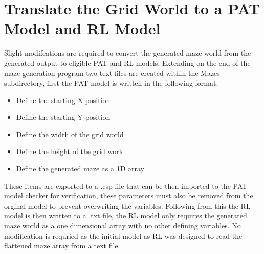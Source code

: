 \documentclass[twoside, 12pt, a4paper]{article}
\begin{document}
\section{Translate the Grid World to a PAT Model and RL Model}
Slight modifcations are required to convert the generated maze world from the generated output to eligible PAT and RL models. Extending on the end of the maze generation program two text files are created within the Mazes subdirectory, first the PAT model is written in the following format:
\begin{itemize}
 \item Define the starting X position
 \item Define the starting Y position
 \item Define the width of the grid world
 \item Define the height of the grid world
 \item Define the generated maze as a 1D array
\end{itemize}
These items are exported to a .csp file that can be then imported to the PAT model checker for verification, these parameters must also be removed from the orginal model to prevent overwriting the variables. Following from this the RL model is then written to a .txt file, the RL model only requires the generated maze world as a one dimensional array with no other defining variables. No modification is requried as the initial model as RL was designed to read the flattened maze array from a text file.
\end{document}
